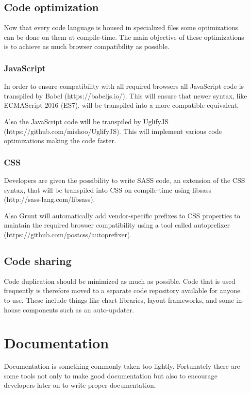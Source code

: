 \documentclass[journal,compsoc,a4paper]{IEEEtran}
\begin{document}
\subsection{Code optimization}
Now that every code language is housed in specialized files some
optimizations can be done on them at compile-time. The main objective of these optimizations
is to achieve as much browser compatibility as possible.
\subsubsection{JavaScript}
In order to ensure compatibility with all required browsers all JavaScript code
is transpiled by Babel (https://babeljs.io/). This will ensure that newer syntax,
like ECMAScript 2016 (ES7), will be transpiled into a more compatible equivalent.

Also the JavaScript code will be transpiled by UglifyJS
(https://github.com/mishoo/UglifyJS). This will implement various code
optimizations\cite{UglifyJSCompressor} making the code faster.
\subsubsection{CSS}
Developers are given the possibility to write SASS code, an extension of the CSS
syntax, that will be transpiled into CSS on compile-time using libsass
(http://sass-lang.com/libsass).

Also Grunt will automatically add vendor-specific prefixes to CSS properties to
maintain the required browser compatibility using a tool called autoprefixer
(https://github.com/postcss/autoprefixer).

\subsection{Code sharing}
Code duplication should be minimized as much as possible. Code that is used
frequently is therefore moved to a separate code repository available for
anyone to use. These include things like chart libraries, layout frameworks, and
some in-house components such as an auto-updater.

\section{Documentation}
Documentation is something commonly taken too lightly. Fortunately there are some
tools not only to make good documentation but also to encourage developers
later on to write proper documentation.
\end{document}
